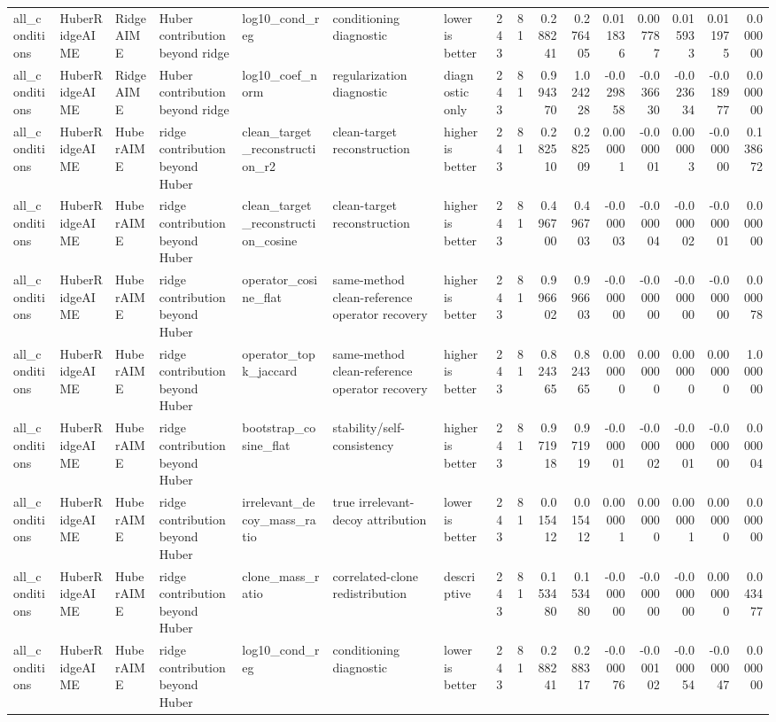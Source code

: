 \begin{table}[t]
\begin{tabular}{lllllllrrrrrrrrr}
all_conditions & HuberRidgeAIME & RidgeAIME & Huber contribution beyond ridge & log10_cond_reg & conditioning diagnostic & lower is better & 243 & 81 & 0.288241 & 0.276405 & 0.011836 & 0.007787 & 0.015933 & 0.011975 & 0.000000 \\
all_conditions & HuberRidgeAIME & RidgeAIME & Huber contribution beyond ridge & log10_coef_norm & regularization diagnostic & diagnostic only & 243 & 81 & 0.994370 & 1.024228 & -0.029858 & -0.036630 & -0.023634 & -0.018977 & 0.000000 \\
all_conditions & HuberRidgeAIME & HuberAIME & ridge contribution beyond Huber & clean_target_reconstruction_r2 & clean-target reconstruction & higher is better & 243 & 81 & 0.282510 & 0.282509 & 0.000001 & -0.000001 & 0.000003 & -0.000000 & 0.138672 \\
all_conditions & HuberRidgeAIME & HuberAIME & ridge contribution beyond Huber & clean_target_reconstruction_cosine & clean-target reconstruction & higher is better & 243 & 81 & 0.496700 & 0.496703 & -0.000003 & -0.000004 & -0.000002 & -0.000001 & 0.000000 \\
all_conditions & HuberRidgeAIME & HuberAIME & ridge contribution beyond Huber & operator_cosine_flat & same-method clean-reference operator recovery & higher is better & 243 & 81 & 0.996602 & 0.996603 & -0.000000 & -0.000000 & -0.000000 & -0.000000 & 0.000078 \\
all_conditions & HuberRidgeAIME & HuberAIME & ridge contribution beyond Huber & operator_topk_jaccard & same-method clean-reference operator recovery & higher is better & 243 & 81 & 0.824365 & 0.824365 & 0.000000 & 0.000000 & 0.000000 & 0.000000 & 1.000000 \\
all_conditions & HuberRidgeAIME & HuberAIME & ridge contribution beyond Huber & bootstrap_cosine_flat & stability/self-consistency & higher is better & 243 & 81 & 0.971918 & 0.971919 & -0.000001 & -0.000002 & -0.000001 & -0.000000 & 0.000004 \\
all_conditions & HuberRidgeAIME & HuberAIME & ridge contribution beyond Huber & irrelevant_decoy_mass_ratio & true irrelevant-decoy attribution & lower is better & 243 & 81 & 0.015412 & 0.015412 & 0.000001 & 0.000000 & 0.000001 & 0.000000 & 0.000000 \\
all_conditions & HuberRidgeAIME & HuberAIME & ridge contribution beyond Huber & clone_mass_ratio & correlated-clone redistribution & descriptive & 243 & 81 & 0.153480 & 0.153480 & -0.000000 & -0.000000 & -0.000000 & 0.000000 & 0.043477 \\
all_conditions & HuberRidgeAIME & HuberAIME & ridge contribution beyond Huber & log10_cond_reg & conditioning diagnostic & lower is better & 243 & 81 & 0.288241 & 0.288317 & -0.000076 & -0.000102 & -0.000054 & -0.000047 & 0.000000 \\

\end{tabular}
\end{table}
